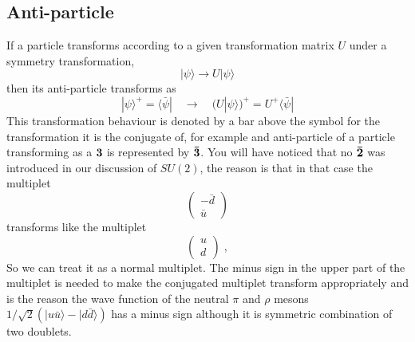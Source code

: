 \documentclass[12pt]{article}
\begin{document}
\subsection{Anti-particle}
If a particle transforms according to a given transformation matrix $U$ under a symmetry transformation,
\[|\psi\rangle\rightarrow U|\psi\rangle\]
then its anti-particle transforms as
\[|\psi\rangle^+=\langle \bar\psi| \quad\rightarrow \quad(U|\psi\rangle )^+=U^+\langle\bar{\psi}|\]
This transformation behaviour is denoted by a bar above the symbol for the transformation it is the conjugate of, for example and anti-particle of a particle transforming as a ${\bf 3}$ is represented by ${\bf \bar 3}$. You will have noticed that no ${\bf \bar 2}$ was introduced in our discussion of $SU(2)$, the reason is that in that case the multiplet
\[\left(\begin{array}{c}-\bar d\\\bar u\end{array}\right)\]
  transforms like the multiplet
  \[\left(\begin{array}{c}u\\d\end{array}\right)\;,\]
    So we can treat it as a normal multiplet. The minus sign in the upper part of the multiplet is needed to make the conjugated multiplet transform appropriately and is the reason the wave function of the neutral $\pi$ and $\rho$ mesons $1/\sqrt{2}(|u\bar{u}\rangle -|d\bar{d}\rangle)$ has a minus sign although it is symmetric combination of two doublets.
\end{document}
